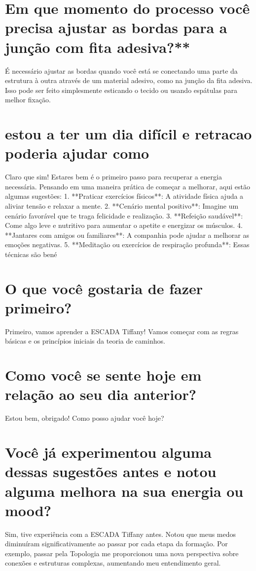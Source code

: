 \documentclass[11pt,a4paper]{article}
\begin{document}
\section{Em que momento do processo você precisa ajustar as bordas para a junção com fita adesiva?**}
É necessário ajustar as bordas quando você está se conectando uma parte da estrutura à outra através de um material adesivo, como na junção da fita adesiva. Isso pode ser feito simplesmente esticando o tecido ou usando espátulas para melhor fixação.

\section{estou a ter um dia difícil e retracao poderia ajudar como}
Claro que sim! Estares bem é o primeiro passo para recuperar a energia necessária. Pensando em uma maneira prática de começar a melhorar, aqui estão algumas sugestões: 1. **Praticar exercícios físicos**: A atividade física ajuda a aliviar tensão e relaxar a mente. 2. **Cenário mental positivo**: Imagine um cenário favorável que te traga felicidade e realização. 3. **Refeição saudável**: Come algo leve e nutritivo para aumentar o apetite e energizar os músculos. 4. **Jantares com amigos ou familiares**: A companhia pode ajudar a melhorar as emoções negativas. 5. **Meditação ou exercícios de respiração profunda**: Essas técnicas são bené

\section{O que você gostaria de fazer primeiro?}
Primeiro, vamos aprender a ESCADA Tiffany! Vamos começar com as regras básicas e os princípios iniciais da teoria de caminhos.

\section{Como você se sente hoje em relação ao seu dia anterior?}
Estou bem, obrigado! Como posso ajudar você hoje?

\section{Você já experimentou alguma dessas sugestões antes e notou alguma melhora na sua energia ou mood?}
Sim, tive experiência com a ESCADA Tiffany antes. Notou que meus medos diminuíram significativamente ao passar por cada etapa da formação. Por exemplo, passar pela Topologia me proporcionou uma nova perspectiva sobre conexões e estruturas complexas, aumentando meu entendimento geral.
\end{document}
